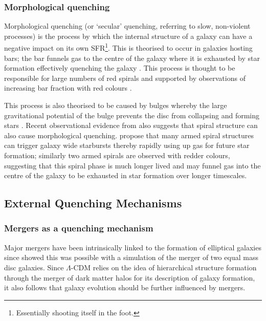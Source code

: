 \subsubsection{Morphological quenching}\label{sec:moprhquench}
Morphological quenching (or `secular' quenching, referring to slow, non-violent processes) is the process by which the internal structure of a galaxy can have a negative impact on its own SFR\footnote{Essentially shooting itself in the foot.}. This is theorised to occur in galaxies hosting bars; the bar funnels gas to the centre of the galaxy \citep{athanassoula92a} where it is exhausted by star formation effectively quenching the galaxy \citep{zurita04, sheth05}. This process is thought to be responsible for large numbers of red spirals and supported by observations of increasing bar fraction with red colours \citep{masters11a}. 

This process is also theorised to be caused by bulges \citep{bluck14} whereby the large gravitational potential of the bulge prevents the disc from collapsing and forming stars \citep{Fang13}. Recent observational evidence from \citep{hart16} also suggests that spiral structure can also cause morphological quenching. \citeauthor{hart16} propose that many armed spiral structures can trigger galaxy wide starbursts thereby rapidly using up gas for future star formation; similarly two armed spirals are observed with redder colours, suggesting that this spiral phase is much longer lived and may funnel gas into the centre of the galaxy to be exhausted in star formation over longer timescales.  
  
\subsection{External Quenching Mechanisms}\label{sec:extquench}
  
\subsubsection{Mergers as a quenching mechanism}\label{sec:mergersquench}

Major mergers have been intrinsically linked to the formation of elliptical galaxies since \citet{toomre72} showed this was possible with a simulation of the merger of two equal mass disc galaxies. Since $\Lambda$-CDM relies on the idea of hierarchical structure formation through the merger of dark matter halos for its description of galaxy formation, it also follows that galaxy evolution should be further influenced by mergers. 

